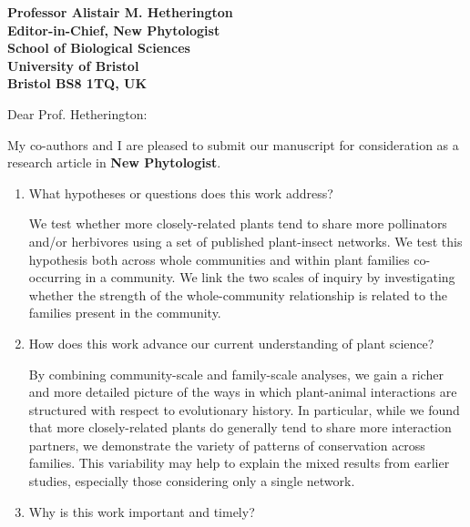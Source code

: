 \documentclass[12pt]{letter}
\begin{document}
\begin{letter}{\bf Professor Alistair M. Hetherington\\
               Editor-in-Chief, New Phytologist\\
               School of Biological Sciences\\
               University of Bristol\\
               Bristol BS8 1TQ, UK
                               }


\opening{Dear Prof. Hetherington:}


	My co-authors and I are pleased to submit our manuscript for consideration as a research article in \textbf{New Phytologist}. 

	\begin{enumerate}

	\item What hypotheses or questions does this work address?
		\smallskip


		We test whether	more closely-related plants tend to share more pollinators and/or herbivores using a set of published plant-insect networks. We test this hypothesis both across whole communities and within plant families co-occurring in a community. We link the two scales of inquiry by investigating whether the strength of the whole-community relationship is related to the families present in the community.

		\smallskip


		\item How does this work advance our current understanding of plant science?
		\smallskip 


		By combining community-scale and family-scale analyses, we gain a richer and more detailed picture of the ways in which plant-animal interactions are structured with respect to evolutionary history. In particular, while we found that more closely-related plants do generally tend to share more interaction partners, we demonstrate the variety of patterns of conservation across families. This variability may help to explain the mixed results from earlier studies, especially those considering only a single network.

		\smallskip

	
		\item Why is this work important and timely?
		\smallskip



\end{enumerate}
\end{letter}
\end{document}
